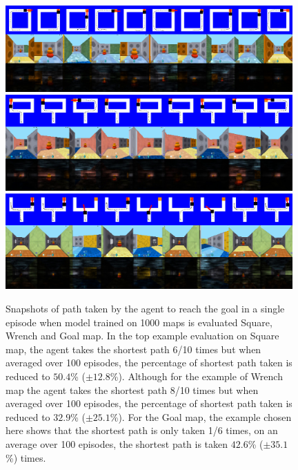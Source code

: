 \begin{figure}[h]
\def\vertspace{1ex}
%
\includegraphics[width=0.98\textwidth,trim=0 672pt 0 0,clip]{./exp-results/training-1000_on_square_map.png}%
\vspace{\vertspace}
%
\includegraphics[width=0.98\textwidth,trim=0 672pt 0 0,clip]{./exp-results/training-1000_on_wrench_map.png}%
\vspace{\vertspace}
%
\includegraphics[width=0.98\textwidth,trim=0 672pt 0 0,clip]{./exp-results/training-1000_on_goal_map.png}%
\caption{Snapshots of path taken by the agent to reach the goal in a single episode when model trained on 1000 maps is evaluated Square, Wrench and Goal map.
  In the top example evaluation on Square map, the agent takes the shortest path 6/10 times but when averaged over 100 episodes, the percentage of shortest path taken is reduced to $50.4$\% ($\pm 12.8$\%).
  Although for the example of Wrench map the agent takes the shortest path 8/10 times but when averaged over 100 episodes, the percentage of shortest path taken is reduced to $32.9$\% ($\pm 25.1$\%).
 For the Goal map, the example chosen here shows that the shortest path is only taken 1/6 times, on an average over 100 episodes, the shortest path is taken $42.6$\% ($\pm 35.1$\%) times.
}
\label{fig:planning-qualitative}
\end{figure}

